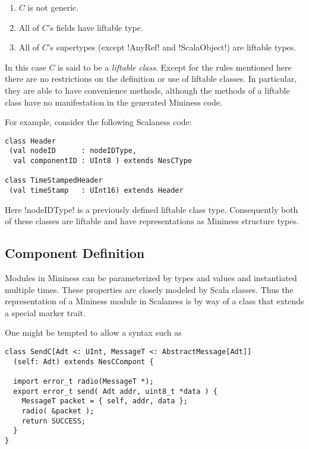 \begin{enumerate}
\item $C$ is not generic.
\item All of $C$'s fields have liftable type.
\item All of $C$'s supertypes (except !AnyRef! and !ScalaObject!) are liftable types.
\end{enumerate}

In this case $C$ is said to be a \textit{liftable class}. Except for the rules mentioned here
there are no restrictions on the definition or use of liftable classes. In particular, they are
able to have convenience methods, although the methods of a liftable class have no manifestation
in the generated Mininess code.

For example, consider the following Scalaness code:

\singlespace
\begin{lstlisting}[language=scalaness]
class Header
 (val nodeID      : nodeIDType,
  val componentID : UInt8 ) extends NesCType

class TimeStampedHeader
 (val timeStamp   : UInt16) extends Header
\end{lstlisting}
\primaryspacing

Here !nodeIDType! is a previously defined liftable class type. Consequently both of these
classes are liftable and have representations as Mininess structure types. 

\subsection{Component Definition}
\label{section-component-definition}

Modules in Mininess can be parameterized by types and values and instantiated multiple times.
These properties are closely modeled by Scala classes. Thus the representation of a Mininess
module in Scalaness is by way of a class that extends a special marker trait.

One might be tempted to allow a syntax such as

\singlespace
\begin{lstlisting}[language=scalaness]
class SendC[Adt <: UInt, MessageT <: AbstractMessage[Adt]]
  (self: Adt) extends NesCCompont {

  import error_t radio(MessageT *);
  export error_t send( Adt addr, uint8_t *data ) {
    MessageT packet = { self, addr, data };
    radio( &packet );
    return SUCCESS;
  }
}
\end{lstlisting}
\primaryspacing

